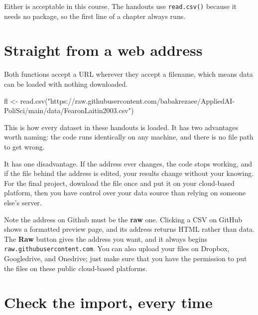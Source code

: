 \documentclass[
  a4paper,
]{scrbook}
\newenvironment{Shaded}{\begin{snugshade}}{\end{snugshade}}
\newcommand{\FunctionTok}[1]{\textcolor[rgb]{0.28,0.35,0.67}{#1}}
\newcommand{\NormalTok}[1]{\textcolor[rgb]{0.00,0.23,0.31}{#1}}
\newcommand{\OtherTok}[1]{\textcolor[rgb]{0.00,0.23,0.31}{#1}}
\newcommand{\StringTok}[1]{\textcolor[rgb]{0.13,0.47,0.30}{#1}}
\begin{document}
Either is acceptable in this course. The handouts use
\texttt{read.csv()} because it needs no package, so the first line of a
chapter always runs.

\section*{Straight from a web
address}\label{straight-from-a-web-address}


Both functions accept a URL wherever they accept a filename, which means
data can be loaded with nothing downloaded.

\begin{Shaded}
\begin{Highlighting}[]
\NormalTok{fl }\OtherTok{\textless{}{-}} \FunctionTok{read.csv}\NormalTok{(}\StringTok{"https://raw.githubusercontent.com/babakrezaee/AppliedAI{-}PoliSci/main/data/FearonLaitin2003.csv"}\NormalTok{)}
\end{Highlighting}
\end{Shaded}

This is how every dataset in these handouts is loaded. It has two
advantages worth naming: the code runs identically on any machine, and
there is no file path to get wrong.

It has one disadvantage. If the address ever changes, the code stops
working, and if the file behind the address is edited, your results
change without your knowing. For the final project, download the file
once and put it on your cloud-based platform, then you have control over
your data source than relying on someone else's server.

Note the address on Github must be the \textbf{raw} one. Clicking a CSV
on GitHub shows a formatted preview page, and its address returns HTML
rather than data. The \textbf{Raw} button gives the address you want,
and it always begins \texttt{raw.githubusercontent.com}. You can also
upload your files on Dropbox, Googledrive, and Onedrive; just make sure
that you have the permission to put the files on these public
cloud-based platforms.

\section*{Check the import, every
time}\label{check-the-import-every-time}
\end{document}
